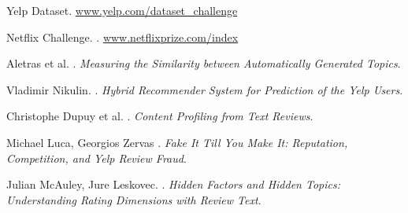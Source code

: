 \documentclass[11pt]{article}
\begin{document}



\begin{thebibliography}{}
	
	
	Yelp Dataset.
	\newblock \href{www.yelp.com/dataset_challenge}{www.yelp.com/dataset\_challenge}
	
Netflix Challenge.
.
\newblock \href{www.netflixprize.com/index}{www.netflixprize.com/index}
	
Aletras et al.
.
\newblock \textit{Measuring the Similarity between Automatically Generated Topics}.

Vladimir Nikulin.
.
\newblock \textit{Hybrid Recommender System for Prediction of the Yelp Users}.

Christophe Dupuy et al.
.
\newblock \textit{Content Profiling from Text Reviews}.

Michael Luca, Georgios Zervas
.
\newblock \textit{Fake It Till You Make It:	Reputation, Competition, and Yelp Review Fraud}.

Julian McAuley, Jure Leskovec.
.
\newblock \textit{Hidden Factors and Hidden Topics:
	Understanding Rating Dimensions with Review Text}.




\end{thebibliography}
\end{document}
